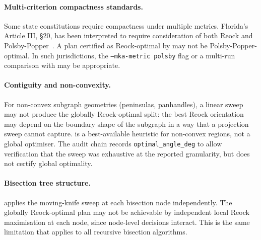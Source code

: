 \paragraph{Multi-criterion compactness standards.}
Some state constitutions require compactness under multiple metrics.
Florida's Article III, \S 20, has been interpreted to require consideration
of both Reock and Polsby-Popper~\citep{floridaConst}.
A plan certified as Reock-optimal by \mka{} may not be Polsby-Popper-optimal.
In such jurisdictions, the \texttt{--mka-metric polsby} flag or a multi-run
comparison with \cvdgeo{} may be appropriate.

\paragraph{Contiguity and non-convexity.}
For non-convex subgraph geometries (peninsulas, panhandles), a linear sweep
may not produce the globally Reock-optimal split: the best Reock orientation
may depend on the boundary shape of the subgraph in a way that a projection
sweep cannot capture.
\mka{} is a best-available heuristic for non-convex regions, not a global
optimiser.
The audit chain records \texttt{optimal\_angle\_deg} to allow verification
that the sweep was exhaustive at the reported granularity, but does not
certify global optimality.

\paragraph{Bisection tree structure.}
\mka{} applies the moving-knife sweep at each bisection node independently.
The globally Reock-optimal plan may not be achievable by independent local
Reock maximisation at each node, since node-level decisions interact.
This is the same limitation that applies to all recursive bisection algorithms.
